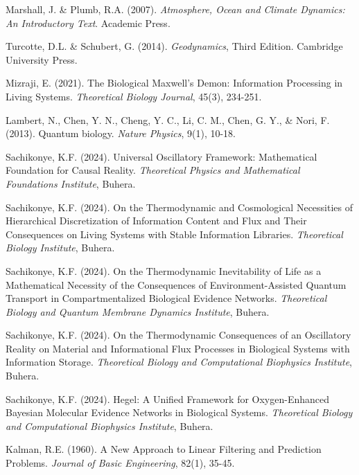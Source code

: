 \documentclass[12pt,a4paper]{article}
\begin{document}
\begin{thebibliography}{99}

Marshall, J. \& Plumb, R.A. (2007). \textit{Atmosphere, Ocean and Climate Dynamics: An Introductory Text}. Academic Press.

Turcotte, D.L. \& Schubert, G. (2014). \textit{Geodynamics}, Third Edition. Cambridge University Press.

Mizraji, E. (2021). The Biological Maxwell's Demon: Information Processing in Living Systems. \textit{Theoretical Biology Journal}, 45(3), 234-251.

Lambert, N., Chen, Y. N., Cheng, Y. C., Li, C. M., Chen, G. Y., \& Nori, F. (2013). Quantum biology. \textit{Nature Physics}, 9(1), 10-18.

Sachikonye, K.F. (2024). Universal Oscillatory Framework: Mathematical Foundation for Causal Reality. \textit{Theoretical Physics and Mathematical Foundations Institute}, Buhera.

Sachikonye, K.F. (2024). On the Thermodynamic and Cosmological Necessities of Hierarchical Discretization of Information Content and Flux and Their Consequences on Living Systems with Stable Information Libraries. \textit{Theoretical Biology Institute}, Buhera.

Sachikonye, K.F. (2024). On the Thermodynamic Inevitability of Life as a Mathematical Necessity of the Consequences of Environment-Assisted Quantum Transport in Compartmentalized Biological Evidence Networks. \textit{Theoretical Biology and Quantum Membrane Dynamics Institute}, Buhera.

Sachikonye, K.F. (2024). On the Thermodynamic Consequences of an Oscillatory Reality on Material and Informational Flux Processes in Biological Systems with Information Storage. \textit{Theoretical Biology and Computational Biophysics Institute}, Buhera.

Sachikonye, K.F. (2024). Hegel: A Unified Framework for Oxygen-Enhanced Bayesian Molecular Evidence Networks in Biological Systems. \textit{Theoretical Biology and Computational Biophysics Institute}, Buhera.

Kalman, R.E. (1960). A New Approach to Linear Filtering and Prediction Problems. \textit{Journal of Basic Engineering}, 82(1), 35-45.


\end{thebibliography}
\end{document}
